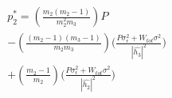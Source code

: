 \documentclass[preview]{standalone}
\begin{document}
\begin{align*}
p_2^\ast = \left(\frac{m_2(m_2 - 1)}{m_2^2 m_3}\right) P \\ - \left(\frac{(m_2 - 1)(m_3 - 1)}{m_2 m_3}\right) \Bigg( \frac{P \sigma_\epsilon^2 + W_{tot} \sigma^2 }{ \left| \hat{h_3} \right| ^2 } \Bigg) \\ + \left(\frac{m_2 - 1}{m_2}\right) \Bigg( \frac{P \sigma_\epsilon^2 + W_{tot} \sigma^2}{\left|\hat{h_2}\right|^2} \Bigg)
\end{align*}
\end{document}
